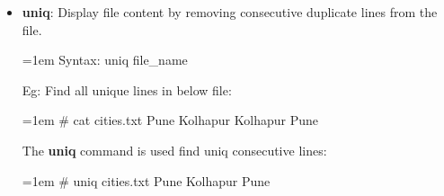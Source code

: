 \begin{flushleft}
\begin{itemize}
		\item \textbf{uniq}: Display file content by removing consecutive duplicate lines from the file.
		\bigskip
		\begin{tcolorbox}[breakable,notitle,boxrule=-0pt,colback=pink,colframe=pink]
			\color{black}
			\font=1em
			Syntax: uniq file\_name
			\font=4pt
		\end{tcolorbox}
		Eg: Find all unique lines in below file:
		\bigskip
		\begin{tcolorbox}[breakable,notitle,boxrule=-0pt,colback=black,colframe=black]
			\color{green}
			\font=1em
			\# cat cities.txt
			\newline
			\color{white}
			Pune
			\newline
			Kolhapur
			\newline
			Kolhapur
			\newline
			Pune
			\font=4pt
		\end{tcolorbox}		
		The \textbf{uniq} command is used find uniq consecutive lines:
		\begin{tcolorbox}[breakable,notitle,boxrule=-0pt,colback=black,colframe=black]
			\color{green}
			\font=1em
			\# uniq cities.txt
			\newline
			\color{white}
			Pune
			\newline
			Kolhapur
			\newline
			Pune
			\font=4pt
		\end{tcolorbox}		
		\bigskip
		\bigskip


\end{itemize}
\end{flushleft}
